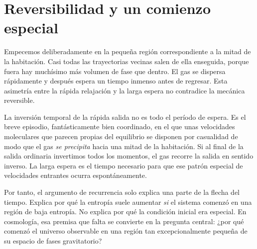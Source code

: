 \section{Reversibilidad y un comienzo especial}

Empecemos deliberadamente en la pequeña región correspondiente a la mitad de la habitación. Casi todas las trayectorias vecinas salen de ella enseguida, porque fuera hay muchísimo más volumen de fase que dentro. El gas se dispersa rápidamente y después espera un tiempo inmenso antes de regresar. Esta asimetría entre la rápida relajación y la larga espera no contradice la mecánica reversible.

La inversión temporal de la rápida salida no es todo el período de espera. Es el breve episodio, fantásticamente bien coordinado, en el que unas velocidades moleculares que parecen propias del equilibrio se disponen por casualidad de modo que el gas \emph{se precipita} hacia una mitad de la habitación. Si al final de la salida ordinaria invertimos todos los momentos, el gas recorre la salida en sentido inverso. La larga espera es el tiempo necesario para que ese patrón especial de velocidades entrantes ocurra espontáneamente.

\begin{classroomqa}\end{classroomqa}

Por tanto, el argumento de recurrencia solo explica una parte de la flecha del tiempo. Explica por qué la entropía suele aumentar \emph{si} el sistema comenzó en una región de baja entropía. No explica por qué la condición inicial era especial. En cosmología, esa premisa que falta se convierte en la pregunta central: ¿por qué comenzó el universo observable en una región tan excepcionalmente pequeña de su espacio de fases gravitatorio?

\begin{classroomqa}\end{classroomqa}

